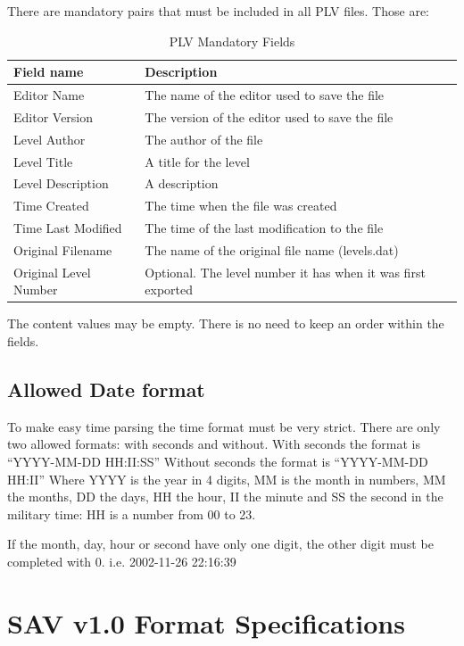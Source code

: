 \documentclass{article}
\begin{document}
 There are mandatory pairs that must be included in all PLV files.
 Those are:

\begin{table}
\begin{tabular}{lp{7cm}}
\hline
 Field name             & Description \\
\hline
 Editor Name            & The name of the editor used to save the file \\
 Editor Version         & The version of the editor used to save the file \\
 Level Author           & The author of the file \\
 Level Title            & A title for the level \\
 Level Description      & A description \\
 Time Created           & The time when the file was created \\
 Time Last Modified     & The time of the last modification to the file \\
 Original Filename      & The name of the original file name (levels.dat) \\
 Original Level Number  & Optional. The level number it has when it was first exported \\
\hline
\end{tabular}
\caption{PLV Mandatory Fields}
\label{plv mandatory fields}
\end{table}
 
 The content values may be empty. There is no need to keep an order within
 the fields.

\subsection{Allowed Date format}
 To make easy time parsing the time format must be very strict.
 There are only two allowed formats: with seconds and without.
 With seconds the format is ``YYYY-MM-DD HH:II:SS''
 Without seconds the format is ``YYYY-MM-DD HH:II''
 Where YYYY is the year in 4 digits, MM is the month in numbers, MM the
 months, DD the days, HH the hour, II the minute and SS the second in the
 military time: HH is a number from 00 to 23.

 If the month, day, hour or second have only one digit, the other digit
 must be completed with 0.
 i.e. 2002-11-26 22:16:39


\section{SAV v1.0 Format Specifications}
\end{document}
